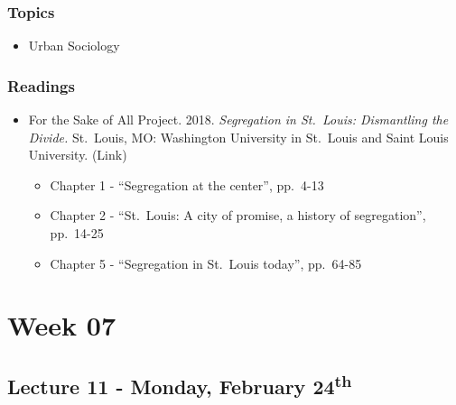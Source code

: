 \documentclass[]{book}
\providecommand{\tightlist}{%
  \setlength{\itemsep}{0pt}\setlength{\parskip}{0pt}}
\begin{document}
\hypertarget{topics-11}{%
\subsubsection*{Topics}\label{topics-11}}

\begin{itemize}
\tightlist
\item
  Urban Sociology
\end{itemize}

\hypertarget{readings-10}{%
\subsubsection*{Readings}\label{readings-10}}

\begin{itemize}
\tightlist
\item
  For the Sake of All Project. 2018. \emph{Segregation in St.~Louis: Dismantling the Divide.} St.~Louis, MO: Washington University in St.~Louis and Saint Louis University. (Link)

  \begin{itemize}
  \tightlist
  \item
    Chapter 1 - ``Segregation at the center'', pp.~4-13
  \item
    Chapter 2 - ``St.~Louis: A city of promise, a history of segregation'', pp.~14-25
  \item
    Chapter 5 - ``Segregation in St.~Louis today'', pp.~64-85
  \end{itemize}
\end{itemize}

\newpage

\hypertarget{week-07}{%
\section*{Week 07}\label{week-07}}

\hypertarget{lecture-11---monday-february-24th}{%
\subsection*{\texorpdfstring{Lecture 11 - Monday, February 24\textsuperscript{th}}{Lecture 11 - Monday, February 24th}}\label{lecture-11---monday-february-24th}}
\end{document}
